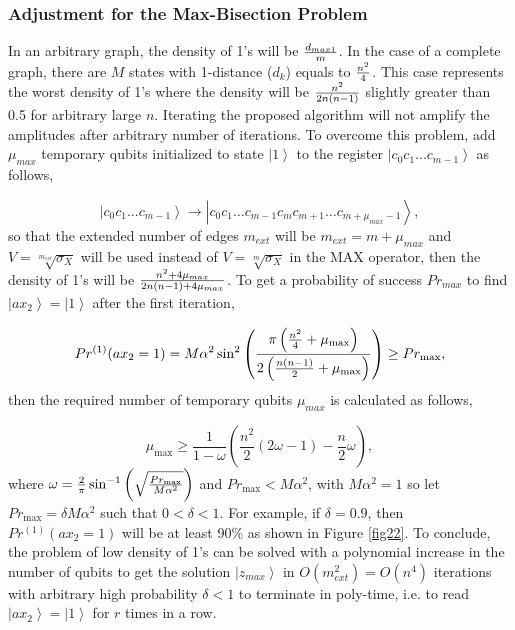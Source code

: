 \documentclass[a4paper]{article}
\begin{document}
\subsubsection*{Adjustment for the Max-Bisection Problem}

In an arbitrary graph, the density of 1's will be ${\textstyle{{d_{max1} } \over m}}$.
In the case of a complete graph, there are $M$ states with 1-distance ($d_k$) equals to ${\textstyle{{n^2} \over 4}}$. 
This case represents the worst density of 1's where the density will be 
${\textstyle{{n^2 } \over {2n(n - 1)}}}$  slightly greater than 0.5 for arbitrary large $n$. 
Iterating the proposed algorithm will not amplify the amplitudes after arbitrary number of iterations.  
To overcome this problem, add 
$\mu_{max}$ temporary qubits initialized to state $\left|1 \right\rangle$ 
to the register $\left| {c_0 c_1 ...c_{m - 1} } \right\rangle$ as follows,

\begin{equation}
\left| {c_0 c_1 ...c_{m - 1} } \right\rangle \to \left| {c_0 c_1 \ldots c_{m - 1}c_{m}c_{m+1}\ldots c_{m+\mu_{max}-1} } \right\rangle,
\end{equation}
\noindent
so that the extended number of edges $m_{ext}$ will be $m_{ext}=m+\mu_{max}$ and $V=\sqrt[{m_{ext} }]{{\sigma _X }}$ will be used instead of 
$V=\sqrt[{m}]{{\sigma _X }}$ in the MAX operator, then the density of 1's will be 
${\textstyle{{n^2  + 4\mu _{max } } \over {2n(n - 1) + 4\mu _{max } }}}$. To get a probability of success $Pr_{max}$ 
to find $\left|ax_2 \right\rangle=\left|1 \right\rangle$ after the first iteration,

\begin{equation}
Pr ^{(1)} {\left( {ax_2  = 1} \right)} = M \alpha ^2 \sin ^2 \left( {\frac{{\pi \left( {{\textstyle{{n^2 } \over 4}} + \mu _{\max } } \right)}}{{2\left( {{\textstyle{{n(n - 1)} \over 2}} + \mu _{\max } } \right)}}} \right) \ge Pr_{\max }, 
\end{equation}
\noindent
then the required number of temporary qubits $\mu_{max}$ is calculated as follows,

\begin{equation}
\mu _{\max }  \ge \frac{1}{{1 - \omega }}\left( {\frac{{n^2 }}{2}\left( {2\omega  - 1} \right) - \frac{n}{2}\omega } \right),
\end{equation}
\noindent
where $\omega  = {\textstyle{2 \over \pi }}\sin ^{ - 1} \left( {\sqrt {{{{Pr_{\max } } \over {M\alpha ^2 }}}} } \right)$ 
and $Pr_{\max }  < {\textstyle{{M \alpha ^2 }}}$, with $M\alpha^2=1$ so let 
$Pr_{\max }  = \delta {\textstyle{{M \alpha ^2 } }}$ such that $0<\delta<1$. For example, if $\delta=0.9$, 
then $Pr ^{(1)} \left( {ax_2  = 1} \right)$ will be at least 90$\%$ as shown in Figure \ref{fig22}. To conclude, the problem of low 
density of 1's can be solved with a polynomial increase in the number of qubits to get the solution 
$\left|z_{max} \right\rangle$ in $O\left(m_{ext}^2\right)=O\left( {n^4 } \right)$ iterations with arbitrary 
high probability $\delta<1$ to terminate in poly-time, i.e. to read $\left|ax_2 \right\rangle=\left|1 \right\rangle$ 
for $r$ times in a row.
\end{document}
